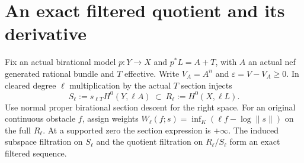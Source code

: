 \documentclass[11pt]{article}
\begin{document}
\section{An exact filtered quotient and its derivative}
Fix an actual birational model $p:Y\to X$ and
$p^*L=A+T$, with $A$ an actual nef generated rational bundle and
$T$ effective. Write $V_A=A^n$ and $\varepsilon=V-V_A\geq0$.
In cleared degree $\ell$ multiplication by the actual $T$ section
injects
\[
 S_\ell:=s_{\ell T}H^0(Y,\ell A)
               \ \subset\ R_\ell:=H^0(X,\ell L).
\]
Use normal proper birational section descent for the right space.
For an original continuous obstacle $f$, assign weights
$W_\ell(f;s)=\inf_K(\ell f-\log\|s\|)$ on the full $R_\ell$.
At a supported zero the section expression is $+\infty$.
The induced subspace filtration on $S_\ell$ and the quotient
filtration on $R_\ell/S_\ell$ form an exact filtered sequence.
\end{document}
